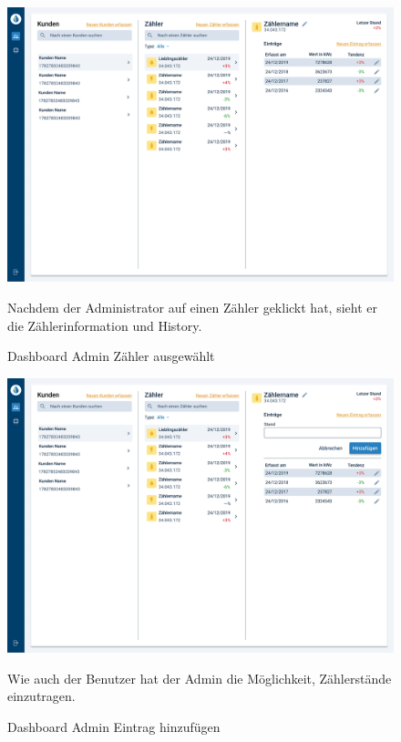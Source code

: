 \newpage

\begin{figure}[h]
	\centering
    \includegraphics[scale=0.3]{img/WebsiteMockup/Dashboard-Admin-ZahlerSelected}
	\caption{Dashboard Admin Zähler ausgewählt} \hfill \break
	Nachdem der Administrator auf einen Zähler geklickt hat, sieht er die Zählerinformation und History.
\end{figure}

\newpage

\begin{figure}[h]
	\centering
    \includegraphics[scale=0.3]{img/WebsiteMockup/Dashboard-Admin-AddEntry}
	\caption{Dashboard Admin Eintrag hinzufügen} \hfill \break
	Wie auch der Benutzer hat der Admin die Möglichkeit, Zählerstände einzutragen.
\end{figure}

